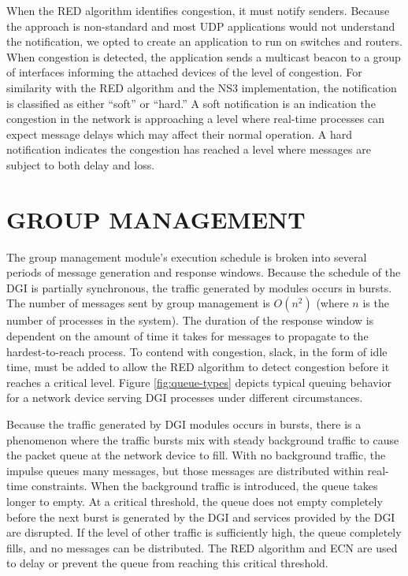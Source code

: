 When the \ac{RED} algorithm identifies congestion, it must notify senders.
Because the approach is non-standard and most UDP applications would not understand the notification, we opted to create an application to run on switches and routers.
When congestion is detected, the application sends a multicast beacon to a group of interfaces informing the attached devices of the level of congestion.
For similarity with the \ac{RED} algorithm and the \ac{NS3} implementation, the notification is classified as either ``soft'' or ``hard.''
A soft notification is an indication the congestion in the network is approaching a level where real-time processes can expect message delays which may affect their normal operation.
A hard notification indicates the congestion has reached a level where messages are subject to both delay and loss.

\section{GROUP MANAGEMENT}

The group management module's execution schedule is broken into several periods of message generation and response windows.
Because the schedule of the \ac{DGI} is partially synchronous, the traffic generated by modules occurs in bursts.
The number of messages sent by group management is $O(n^2)$ (where $n$ is the number of processes in the system).
The duration of the response window is dependent on the amount of time it takes for messages to propagate to the hardest-to-reach process.
To contend with congestion, slack, in the form of idle time, must be added to allow the \ac{RED} algorithm to detect congestion before it reaches a critical level.
Figure \ref{fig:queue-types} depicts typical queuing behavior for a network device serving \ac{DGI} processes under different circumstances.

Because the traffic generated by \ac{DGI} modules occurs in bursts, there is a phenomenon where the traffic bursts mix with steady background traffic to cause the packet queue at the network device to fill.
With no background traffic, the impulse queues many messages, but those messages are distributed within real-time constraints.
When the background traffic is introduced, the queue takes longer to empty.
At a critical threshold, the queue does not empty completely before the next burst is generated by the \ac{DGI} and services provided by the \ac{DGI} are disrupted.
If the level of other traffic is sufficiently high, the queue completely fills, and no messages can be distributed.
The \ac{RED} algorithm and \ac{ECN} are used to delay or prevent the queue from reaching this critical threshold.

